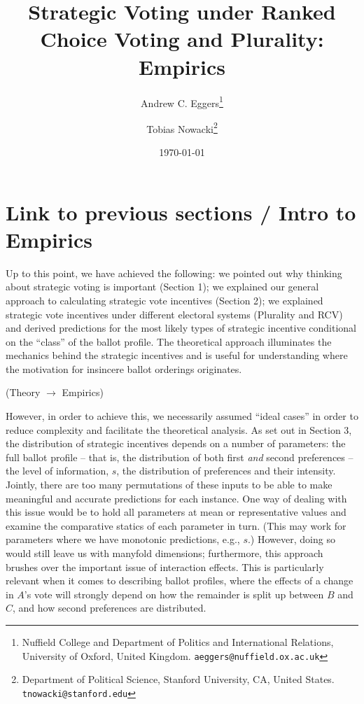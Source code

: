 \documentclass[11pt, letter]{article}
\begin{document}
\author{Andrew C. Eggers\thanks{Nuffield College and Department of Politics and International Relations, University of Oxford, United Kingdom. \texttt{aeggers@nuffield.ox.ac.uk}}
\and
Tobias Nowacki\thanks{Department of Political Science, Stanford University, CA, United States. \texttt{tnowacki@stanford.edu}}}
\date{\today}
\title{Strategic Voting under Ranked Choice Voting and Plurality: Empirics}

\maketitle

\doublespacing %

\listoftodos

\section{Link to previous sections / Intro to Empirics}

Up to this point, we have achieved the following: we pointed out why thinking about strategic voting is important (Section 1); we explained our general approach to calculating strategic vote incentives (Section 2); we explained strategic vote incentives under different electoral systems (Plurality and RCV) and derived predictions for the most likely types of strategic incentive conditional on the ``class'' of the ballot profile. The theoretical approach illuminates the mechanics behind the strategic incentives and is useful for understanding where the motivation for insincere ballot orderings originates. 

(Theory $\rightarrow$ Empirics)

However, in order to achieve this, we necessarily assumed ``ideal cases'' in order to reduce complexity and facilitate the theoretical analysis. As set out in Section 3, the distribution of strategic incentives depends on a number of parameters: the full ballot profile -- that is, the distribution of both first \emph{and} second preferences -- the level of information, $s$, the distribution of preferences and their intensity. Jointly, there are too many permutations of these inputs to be able to make meaningful and accurate predictions for each instance. One way of dealing with this issue would be to hold all parameters at mean or representative values and examine the comparative statics of each parameter in turn. (This may work for parameters where we have monotonic predictions, e.g., $s$.) However, doing so would still leave us with manyfold dimensions; furthermore, this approach brushes over the important issue of interaction effects. This is particularly relevant when it comes to describing ballot profiles, where the effects of a change in $A$'s vote will strongly depend on how the remainder is split up between $B$ and $C$, and how second preferences are distributed.
\end{document}
